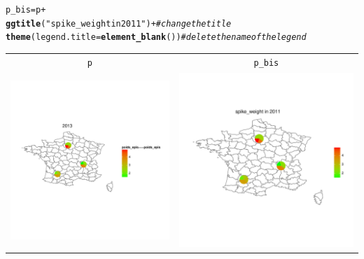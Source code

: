 \documentclass{article}\usepackage[]{graphicx}\usepackage[]{color}
\makeatletter
\newcommand{\hlstr}[1]{\textcolor[rgb]{0.192,0.494,0.8}{#1}}%
\newcommand{\hlcom}[1]{\textcolor[rgb]{0.678,0.584,0.686}{\textit{#1}}}%
\newcommand{\hlopt}[1]{\textcolor[rgb]{0,0,0}{#1}}%
\newcommand{\hlstd}[1]{\textcolor[rgb]{0.345,0.345,0.345}{#1}}%
\newcommand{\hlkwb}[1]{\textcolor[rgb]{0.69,0.353,0.396}{#1}}%
\newcommand{\hlkwc}[1]{\textcolor[rgb]{0.333,0.667,0.333}{#1}}%
\newcommand{\hlkwd}[1]{\textcolor[rgb]{0.737,0.353,0.396}{\textbf{#1}}}%
\newenvironment{kframe}{%
 \def\at@end@of@kframe{}%
 \ifinner\ifhmode%
  \def\at@end@of@kframe{\end{minipage}}%
  \begin{minipage}{\columnwidth}%
 \fi\fi%
 \def\FrameCommand##1{\hskip\@totalleftmargin \hskip-\fboxsep
 \colorbox{shadecolor}{##1}\hskip-\fboxsep
     \hskip-\linewidth \hskip-\@totalleftmargin \hskip\columnwidth}%
 \MakeFramed {\advance\hsize-\width
   \@totalleftmargin\z@ \linewidth\hsize
   \@setminipage}}%
 {\par\unskip\endMakeFramed%
 \at@end@of@kframe}
\newenvironment{knitrout}{}{} %
\makeatother
\begin{document}
\begin{itemize}
\begin{itemize}
\begin{knitrout}
\begin{kframe}
\begin{alltt}
\hlstd{p_bis} \hlkwb{=} \hlstd{p} \hlopt{+}
        \hlkwd{ggtitle}\hlstd{(}\hlstr{"spike_weight in 2011"}\hlstd{)} \hlopt{+} \hlcom{# change the title}
        \hlkwd{theme}\hlstd{(}\hlkwc{legend.title}\hlstd{=}\hlkwd{element_blank}\hlstd{())} \hlcom{# delete the name of the legend}
\end{alltt}
\end{kframe}
\end{knitrout}

\begin{center}
\begin{tabular}{cc}
\texttt{p} & \texttt{p\_bis} \\
\begin{knitrout}
\definecolor{shadecolor}{rgb}{0.969, 0.969, 0.969}\color{fgcolor}

{\centering \includegraphics[width=.4\textwidth]{figures/shinemas2R_unnamed-chunk-85-1} 

}



\end{knitrout}
&
\begin{knitrout}
\definecolor{shadecolor}{rgb}{0.969, 0.969, 0.969}\color{fgcolor}

{\centering \includegraphics[width=.4\textwidth]{figures/shinemas2R_unnamed-chunk-86-1} 

}



\end{knitrout}
\\
\end{tabular}
\end{center}



\end{itemize}
\end{itemize}
\end{document}
